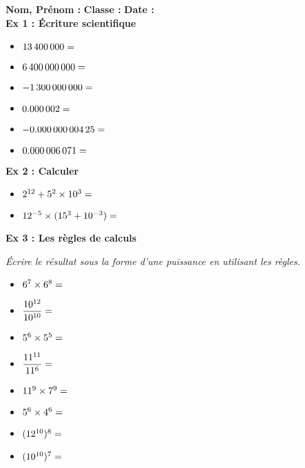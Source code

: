 



\textbf{Nom, Prénom :} \hspace{8cm} \textbf{Classe :} \hspace{3cm} \textbf{Date :}\\

\textbf{Ex 1 : Écriture scientifique}

\begin{multicols}{2}
  \begin{itemize}[label={$\bullet$}]
  \item $\SI{13400000}{} = \dotfill$
  \item $\SI{6400000000}{} = \dotfill$
  \item $\SI{-1300000000}{} = \dotfill$
  \item $\SI{0,000002}{} = \dotfill$
  \item $\SI{-0,00000000425}{} = \dotfill$
  \item $\SI{0,000006071}{} = \dotfill$
  \end{itemize}
\end{multicols}

\textbf{Ex 2 : Calculer}

\begin{multicols}{2}
  \begin{itemize}[label={$\bullet$}]
  \item $ 2^{12} + 5^2 \times 10^3 = \dotfill$
  \item $ 12^{-5} \times ( 15^3 + 10^{-3}) = \dotfill$
  \end{itemize}
\end{multicols}

\textbf{Ex 3 : Les règles de calculs}

\textit{Écrire le résultat sous la forme d'une puissance en utilisant les règles.}

\begin{multicols}{4}
  \begin{itemize}[label={$\bullet$}]
  \item $6^{7}  \times  6^{8}  =  \dotfill$
  \item $\dfrac{10^{12}}{10^{10}} = \dotfill$
  \item $5^{6} \times 5^{5} = \dotfill$
  \item $\dfrac{11^{11}}{11^{6}} = \dotfill$
  \item $11^{9} \times 7^{9} = \dotfill$
  \item $5^{6} \times 4^{6} = \dotfill$
  \item $(12^{10})^{8} = \dotfill$
  \item $(10^{10})^{7} = \dotfill$
  \end{itemize}
\end{multicols}


